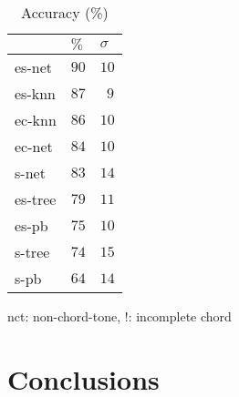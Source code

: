 \documentclass{article}
\begin{document}
\begin{table}
  \centering
  \begin{tabular}{l|p{.5cm}p{.5cm}}
       & $\%$     & $\sigma$ \\
\hline
es-net &$   90  $&$ 10$   \\
es-knn &$   87  $&$~~9$   \\
ec-knn &$   86  $&$ 10$   \\
ec-net &$   84  $&$ 10$   \\ 
s-net  &$   83  $&$ 14$   \\
es-tree&$   79  $&$ 11$   \\
es-pb  &$   75  $&$ 10$   \\
s-tree &$   74  $&$ 15$   \\
s-pb   &$   64  $&$ 14$   \\

  \end{tabular}                                                        

\medskip

nct: non-chord-tone, !: incomplete chord
  \caption{Accuracy (\%)}
  \label{tab:accuracy}
\end{table}

\section{Conclusions}
\label{sec:conclusions}




\end{document}
